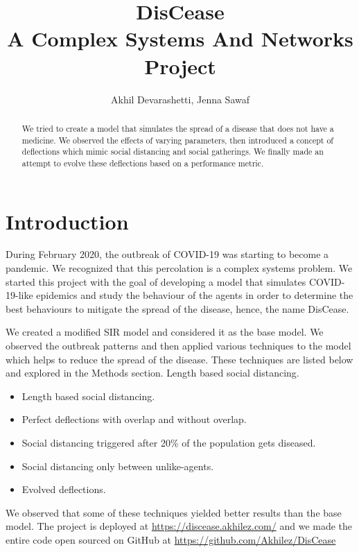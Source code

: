\documentclass[a4paper,11pt]{article}
\title{DisCease\\A Complex Systems And Networks Project}
\author{Akhil Devarashetti, Jenna Sawaf}
\begin{document}
    \maketitle

    \begin{abstract}
        We tried to create a model that simulates the spread of a disease that does not have a medicine. We observed the effects of varying parameters, then introduced a concept of deflections which mimic social distancing and social gatherings. We finally made an attempt to evolve these deflections based on a performance metric.
    \end{abstract}

    \section{Introduction}
    During February 2020, the outbreak of COVID-19 was starting to become a pandemic. We recognized that this percolation is a complex systems problem. We started this project with the goal of developing a model that simulates COVID-19-like epidemics and study the behaviour of the agents in order to determine the best behaviours to mitigate the spread of the disease, hence, the name DisCease.

    We created a modified SIR model \cite{herdImm} and considered it as the base model. We observed the outbreak patterns and then applied various techniques to the model which helps to reduce the spread of the disease. These techniques are listed below and explored in the Methods section.
    Length based social distancing.

    \begin{itemize}
        \item Length based social distancing.
        \item Perfect deflections with overlap and without overlap.
        \item Social distancing triggered after 20\% of the population gets diseased.
        \item Social distancing only between unlike-agents.
        \item Evolved deflections.
    \end{itemize}

    We observed that some of these techniques yielded better results than the base model. The project is deployed at \url{https://discease.akhilez.com/} and we made the entire code open sourced on GitHub at \url{https://github.com/Akhilez/DisCease}
\end{document}
